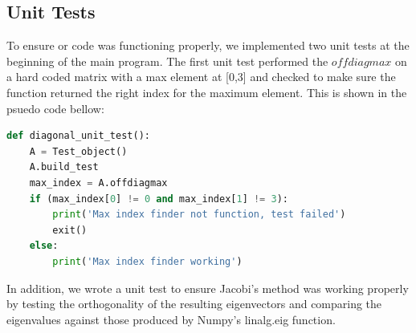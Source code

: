 \documentclass{emulateapj}
\begin{document}
\subsection{Unit Tests}
To ensure or code was functioning properly, we implemented two unit tests at the beginning of the main program. The first unit test performed the $offdiagmax$ on a hard coded matrix with a max element at [0,3] and checked to make sure the function returned the right index for the maximum element. This is shown in the psuedo code bellow:
\begin{lstlisting}[language=Python]
def diagonal_unit_test():
    A = Test_object()
    A.build_test
    max_index = A.offdiagmax
    if (max_index[0] != 0 and max_index[1] != 3):
        print('Max index finder not function, test failed')
        exit()
    else:
        print('Max index finder working')
\end{lstlisting}
In addition, we wrote a unit test to ensure Jacobi's method was working properly by testing the orthogonality of the resulting eigenvectors and comparing the eigenvalues against those produced by Numpy's linalg.eig function.
\end{document}
